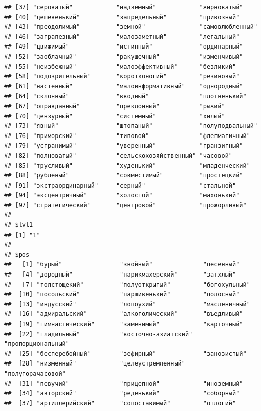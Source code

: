 \documentclass[11pt]{article}\usepackage[]{graphicx}\usepackage[]{color}
\makeatletter
\newenvironment{kframe}{%
 \def\at@end@of@kframe{}%
 \ifinner\ifhmode%
  \def\at@end@of@kframe{\end{minipage}}%
  \begin{minipage}{\columnwidth}%
 \fi\fi%
 \def\FrameCommand##1{\hskip\@totalleftmargin \hskip-\fboxsep
 \colorbox{shadecolor}{##1}\hskip-\fboxsep
     \hskip-\linewidth \hskip-\@totalleftmargin \hskip\columnwidth}%
 \MakeFramed {\advance\hsize-\width
   \@totalleftmargin\z@ \linewidth\hsize
   \@setminipage}}%
 {\par\unskip\endMakeFramed%
 \at@end@of@kframe}
\newenvironment{knitrout}{}{} %
\makeatother
\begin{document}
\begin{knitrout}
\begin{kframe}
\begin{verbatim}
## [37] "сероватый"            "надземный"            "жирноватый"          
## [40] "дешевенький"          "запредельный"         "привозный"           
## [43] "преодолимый"          "земной"               "самовлюбленный"      
## [46] "затрапезный"          "малозаметный"         "легальный"           
## [49] "движимый"             "истинный"             "ординарный"          
## [52] "заоблачный"           "ракушечный"           "изменчивый"          
## [55] "неизбежный"           "малоэффективный"      "безликий"            
## [58] "подозрительный"       "коротконогий"         "резиновый"           
## [61] "настенный"            "малоинформативный"    "однородный"          
## [64] "склонный"             "вводный"              "плотненький"         
## [67] "оправданный"          "преклонный"           "рыжий"               
## [70] "цензурный"            "системный"            "хилый"               
## [73] "явный"                "штопаный"             "полуподвальный"      
## [76] "приморский"           "типовой"              "флегматичный"        
## [79] "устранимый"           "уверенный"            "транзитный"          
## [82] "полноватый"           "сельскохозяйственный" "часовой"             
## [85] "трусливый"            "худенький"            "младенческий"        
## [88] "рубленый"             "совместимый"          "простецкий"          
## [91] "экстраординарный"     "серный"               "стальной"            
## [94] "эксцентричный"        "холостой"             "махонький"           
## [97] "стратегический"       "центровой"            "прожорливый"         
## 
## $lvl1
## [1] "1"
## 
## $pos
##   [1] "бурый"                "знойный"              "песенный"            
##   [4] "дородный"             "парикмахерский"       "затхлый"             
##   [7] "толстощекий"          "полуоткрытый"         "богохульный"         
##  [10] "посольский"           "паршивенький"         "полосный"            
##  [13] "индусский"            "лопоухий"             "масленичный"         
##  [16] "адмиральский"         "алкоголический"       "въедливый"           
##  [19] "гимнастический"       "заменимый"            "карточный"           
##  [22] "гладильный"           "восточно-азиатский"   "пропорциональный"    
##  [25] "бесперебойный"        "зефирный"             "занозистый"          
##  [28] "низменный"            "целеустремленный"     "полуторачасовой"     
##  [31] "певучий"              "прицепной"            "иноземный"           
##  [34] "авторский"            "реденький"            "соборный"            
##  [37] "артиллерийский"       "сопоставимый"         "отлогий"             

\end{verbatim}
\end{kframe}
\end{knitrout}
\end{document}
